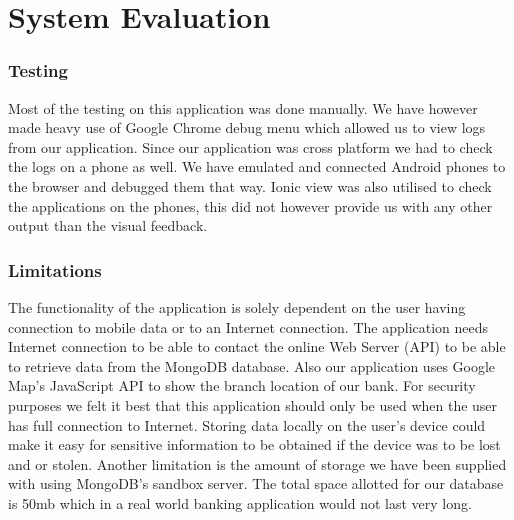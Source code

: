 \chapter{System Evaluation}
\subsection{Testing}
    Most of the testing on this application was done manually. We have however made heavy use of Google Chrome debug menu which allowed us to view logs from our application.
    Since our application was cross platform we had to check the logs on a phone as well. We have emulated and connected Android phones to the browser and debugged them that way.
    Ionic view was also utilised to check the applications on the phones, this did not however provide us with any other output than the visual feedback.

\subsection{Limitations}
The functionality of the application is solely dependent on the user having connection to mobile data or to an Internet connection. The application needs Internet connection to be able to contact the online Web Server (API) to be able to retrieve data from the MongoDB database. Also our application uses Google Map’s JavaScript API to show the branch location of our bank. For security purposes we felt it best that this application should only be used when the user has full connection to Internet. Storing data locally on the user's device could make it easy for sensitive information to be obtained if the device was to be lost and or stolen. Another limitation is the amount of storage we have been supplied with using MongoDB's sandbox server. The total space allotted for our database is 50mb which in a real world banking application would not last very long.

